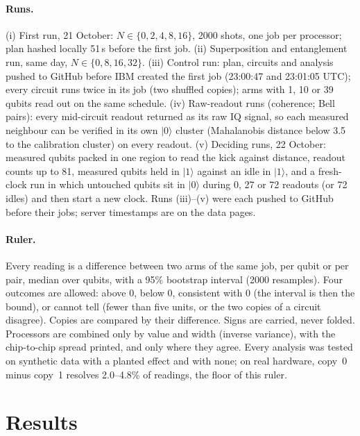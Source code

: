 \documentclass[reprint,amsmath,amssymb,aps,superscriptaddress,nofootinbib]{revtex4-2}
\begin{document}
\paragraph*{Runs.} (i) First run, 21 October: $N\in\{0,2,4,8,16\}$, 2000 shots, one job per processor; plan hashed locally 51\,s before the first job. (ii) Superposition and entanglement run, same day, $N\in\{0,8,16,32\}$. (iii) Control run: plan, circuits and analysis pushed to GitHub before IBM created the first job (23:00:47 and 23:01:05 UTC); every circuit runs twice in its job (two shuffled copies); arms with 1, 10 or 39 qubits read out on the same schedule. (iv) Raw-readout runs (coherence; Bell pairs): every mid-circuit readout returned as its raw IQ signal, so each measured neighbour can be verified in its own $|0\rangle$ cluster (Mahalanobis distance below 3.5 to the calibration cluster) on every readout. (v) Deciding runs, 22 October: measured qubits packed in one region to read the kick against distance, readout counts up to 81, measured qubits held in $|1\rangle$ against an idle in $|1\rangle$, and a fresh-clock run in which untouched qubits sit in $|0\rangle$ during 0, 27 or 72 readouts (or 72 idles) and then start a new clock. Runs (iii)--(v) were each pushed to GitHub before their jobs; server timestamps are on the data pages.

\paragraph*{Ruler.} Every reading is a difference between two arms of the same job, per qubit or per pair, median over qubits, with a 95\% bootstrap interval (2000 resamples). Four outcomes are allowed: above 0, below 0, consistent with 0 (the interval is then the bound), or cannot tell (fewer than five units, or the two copies of a circuit disagree). Copies are compared by their difference. Signs are carried, never folded. Processors are combined only by value and width (inverse variance), with the chip-to-chip spread printed, and only where they agree. Every analysis was tested on synthetic data with a planted effect and with none; on real hardware, copy~0 minus copy~1 resolves 2.0--4.8\% of readings, the floor of this ruler.

\section{Results}
\end{document}
